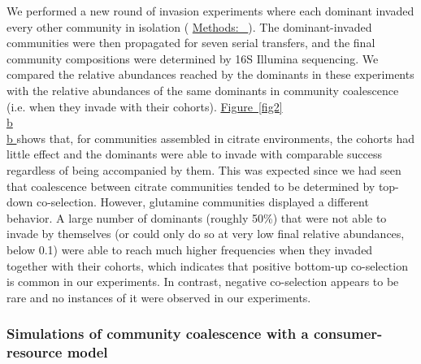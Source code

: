 \documentclass[a4paper,10pt]{article}
\newcommand{\figref}[2][]{%
  \hyperref[{#2}]{%
    Figure~\ref*{#2}%
    \ifx\\#1\\%
    \else
      #1%
    \fi
  }%
}
\newcommand{\methodsref}[1]{%
  \hyperref[{methods:#1}]{%
   Methods:~\nameref*{methods:#1}%
  }%
}
\begin{document}
We performed a new round of invasion experiments where each dominant invaded every
other community in isolation (\methodsref{competitions}). The dominant-invaded
communities were then propagated for seven serial transfers, and the final
community compositions were determined by 16S Illumina sequencing.
We compared the relative abundances reached by the dominants in these experiments
with the relative abundances of the same dominants in community coalescence
(i.e. when they invade with their cohorts).
\figref[b]{fig2} shows that, for communities assembled in citrate environments,
the cohorts had little effect and the dominants were able to invade with comparable
success regardless of being accompanied by them.
This was expected since we had seen that coalescence between citrate communities
tended to be determined by top-down co-selection.
However, glutamine communities displayed a different behavior.
A large number of dominants (roughly 50\%) that were not able to invade by themselves
(or could only do so at very low final relative abundances, below 0.1)
were able to reach much higher frequencies when they invaded together with their cohorts,
which indicates that positive bottom-up co-selection is common in our experiments.
In contrast, negative co-selection appears to be rare and no instances of it were
observed in our experiments.

\subsubsection*{Simulations of community coalescence with a consumer-resource model}
\end{document}
